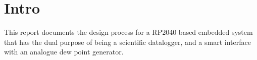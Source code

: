\section{Intro}

This report documents the design process for a RP2040 based embedded system that has the dual purpose of being a scientific datalogger, and a smart interface with an analogue dew point generator.


